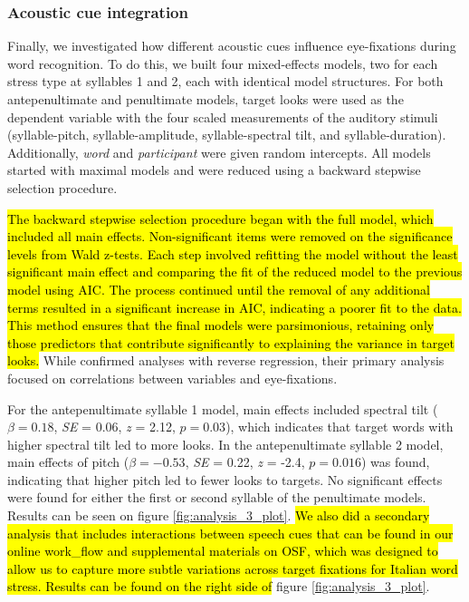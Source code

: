 \subsubsection{Acoustic cue integration}

Finally, we investigated how different acoustic cues influence eye-fixations during word recognition. To do this, we built four mixed-effects models, two for each stress type at syllables 1 and 2, each with identical model structures. For both antepenultimate and penultimate models, target looks were used as the dependent variable with the four scaled measurements of the auditory stimuli (syllable-pitch, syllable-amplitude, syllable-spectral tilt, and syllable-duration). Additionally, \textit{word} and \textit{participant} were given random intercepts. All models started with maximal models and were reduced using a backward stepwise selection procedure. 

\hl{The backward stepwise selection procedure began with the full model, which included all main effects. Non-significant items were removed on the significance levels from Wald z-tests. Each step involved refitting the model without the least significant main effect and comparing the fit of the reduced model to the previous model using AIC. The process continued until the removal of any additional terms resulted in a significant increase in AIC, indicating a poorer fit to the data. This method ensures that the final models were parsimonious, retaining only those predictors that contribute significantly to explaining the variance in target looks.} While \cite{Sulpizio_McQueen_2012} confirmed analyses with reverse regression, their primary analysis focused on correlations between variables and eye-fixations. 

For the antepenultimate syllable 1 model, main effects included spectral tilt ($\beta= 0.18$, \textit{SE} = 0.06, \textit{z} = 2.12, $p = 0.03$), which indicates that target words with higher spectral tilt led to more looks. In the antepenultimate syllable 2 model, main effects of pitch ($\beta= -0.53$, \textit{SE} = 0.22, \textit{z} = -2.4, $p = 0.016$) was found, indicating that higher pitch led to fewer looks to targets. No significant effects were found for either the first or second syllable of the penultimate models. Results can be seen on figure \ref{fig:analysis_3_plot}. \hl{We also did a secondary analysis that includes interactions between speech cues that can be found in our online work\_flow and supplemental materials on OSF, which was designed to allow us to capture more subtle variations across target fixations for Italian word stress. Results can be found on the right side of} figure \ref{fig:analysis_3_plot}. 

